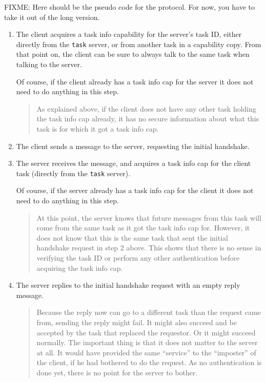 \documentclass[9pt,a4paper]{extarticle}
\newenvironment{comment}{\footnotesize \begin{quote}}{\end{quote}}
\begin{document}
FIXME: Here should be the pseudo code for the protocol.  For now, you
have to take it out of the long version.

\begin{enumerate}
  
\item The client acquires a task info capability for the server's task
  ID, either directly from the \texttt{task} server, or from another
  task in a capability copy.  From that point on, the client can be
  sure to always talk to the same task when talking to the server.
  
  Of course, if the client already has a task info cap for the server
  it does not need to do anything in this step.

\begin{comment}
  As explained above, if the client does not have any other task
  holding the task info cap already, it has no secure information
  about what this task is for which it got a task info cap.
\end{comment}

\item The client sends a message to the server, requesting the initial
  handshake.
  
\item The server receives the message, and acquires a task info cap
  for the client task (directly from the \texttt{task} server).
  
  Of course, if the server already has a task info cap for the client
  it does not need to do anything in this step.

\begin{comment}
  At this point, the server knows that future messages from this task
  will come from the same task as it got the task info cap for.
  However, it does not know that this is the same task that sent the
  initial handshake request in step 2 above.  This shows that there is
  no sense in verifying the task ID or perform any other
  authentication before acquiring the task info cap.
\end{comment}

\item The server replies to the initial handshake request with an
  empty reply message.

\begin{comment}
  Because the reply now can go to a different task than the request
  came from, sending the reply might fail.  It might also succeed and
  be accepted by the task that replaced the requestor.  Or it might
  succeed normally.  The important thing is that it does not matter to
  the server at all.  It would have provided the same ``service'' to
  the ``imposter'' of the client, if he had bothered to do the
  request.  As no authentication is done yet, there is no point for
  the server to bother.
  

\end{comment}
\end{enumerate}
\end{document}
